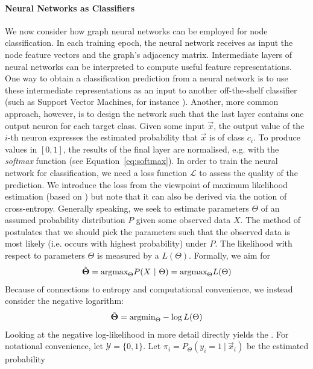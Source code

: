 \documentclass[
	fontsize=10pt, %
	twoside=true, %
	secnumdepth=1, %
  toc=indentunnumbered %
]{kaobook}
\begin{document}
\paragraph{Neural Networks as Classifiers} We now consider how graph neural
networks can be employed for node classification. In each training epoch, the
neural network receives as input the node feature vectors and the graph's
adjacency matrix.
%
Intermediate layers of neural
networks can be interpreted to compute useful feature representations. One way
to obtain a classification prediction from a neural network is to use these
intermediate representations as an input to another off-the-shelf classifier
(such as Support Vector Machines, for instance
\cite{liu_CombiningConvolutionalNeural_2018}). Another, more common approach,
however, is to design the network such that the last layer contains one output
neuron for each target class. Given some input $\vec x$, the output value of the
$i$-th neuron expresses the estimated probability that $\vec x$ is of class
$c_i$. To produce values in $[0,1]$, the results of the final layer are
normalised, e.g. with the \textit{softmax} function (see Equation~\ref{eq:softmax}).
%
In order to train the neural network for classification, we need a loss function
$\mathcal{L}$ to assess the quality of the prediction. We introduce the
 loss from the viewpoint of maximum likelihood
estimation (based on \cite{zhang_dive_nodate}) but note that it can also be
derived via the notion of cross-entropy.
%
Generally speaking, we seek to estimate parameters $\Theta$ of an assumed
probability distribution $P$ given some observed data $X$. The method of
 postulates that we should pick the
parameters such that the observed data is most likely (i.e. occurs with highest
probability) under $P$. The likelihood with respect to parameters $\Theta$ is measured by
a  $L(\Theta)$.
Formally, we aim for
\begin{align*}
  \hat \Theta = \argmax_\Theta P(X~|~\Theta) = \argmax_\Theta L(\Theta)
\end{align*}
Because of connections to entropy and computational convenience, we instead
consider the negative logarithm:
\begin{align*}
  \hat \Theta = \argmin_\Theta -\log L(\Theta)
\end{align*}
Looking at the negative log-likelihood in more detail directly yields the
.
For notational convenience, let $\mathcal{Y} =
\{0,1\}$. Let $\pi_i = P_\Theta(y_i=1~|~\vec x_i)$ be the estimated probability
\end{document}
